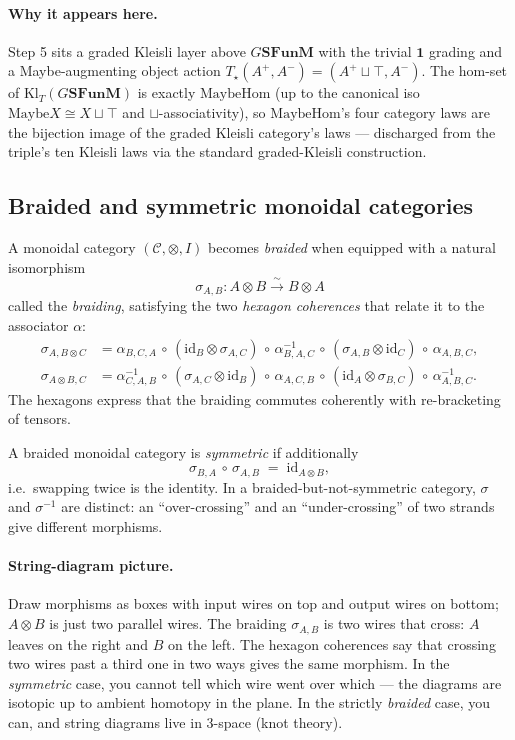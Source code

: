 \documentclass[11pt]{article}
\newcommand{\SFunM}{\mathbf{SFunM}}
\newcommand{\id}{\mathrm{id}}
\newcommand{\Maybe}{\mathrm{Maybe}}
\begin{document}
\paragraph{Why it appears here.}
Step 5 sits a graded Kleisli layer above $G\SFunM$ with the trivial
$\mathbf{1}$ grading and a Maybe-augmenting object action
$T_\star(A^+, A^-) = (A^+ \sqcup \top, A^-)$.  The hom-set of
$\mathrm{Kl}_T(G\SFunM)$ is exactly $\mathrm{MaybeHom}$ (up to the
canonical iso $\Maybe X \cong X \sqcup \top$ and $\sqcup$-associativity),
so $\mathrm{MaybeHom}$'s four category laws are the bijection image
of the graded Kleisli category's laws — discharged from the triple's
ten Kleisli laws via the standard graded-Kleisli construction.

\subsection{Braided and symmetric monoidal categories}
\label{sec:braided}

A monoidal category $(\mathcal{C}, \otimes, I)$ becomes
\emph{braided} when equipped with a natural isomorphism
\[
  \sigma_{A,B} : A \otimes B \xrightarrow{\sim} B \otimes A
\]
called the \emph{braiding}, satisfying the two \emph{hexagon
coherences} that relate it to the associator $\alpha$:
\begin{align*}
  \sigma_{A, B \otimes C}
    &= \alpha_{B,C,A} \,\circ\, (\id_B \otimes \sigma_{A,C}) \,\circ\,
       \alpha_{B,A,C}^{-1} \,\circ\, (\sigma_{A,B} \otimes \id_C) \,\circ\,
       \alpha_{A,B,C}, \\
  \sigma_{A \otimes B, C}
    &= \alpha_{C,A,B}^{-1} \,\circ\, (\sigma_{A,C} \otimes \id_B) \,\circ\,
       \alpha_{A,C,B} \,\circ\, (\id_A \otimes \sigma_{B,C}) \,\circ\,
       \alpha_{A,B,C}^{-1}.
\end{align*}
The hexagons express that the braiding commutes coherently with
re-bracketing of tensors.

A braided monoidal category is \emph{symmetric} if additionally
\[
  \sigma_{B, A} \,\circ\, \sigma_{A, B} \;=\; \id_{A \otimes B},
\]
i.e.\ swapping twice is the identity.  In a braided-but-not-symmetric
category, $\sigma$ and $\sigma^{-1}$ are distinct: an
``over-crossing'' and an ``under-crossing'' of two strands give
different morphisms.

\paragraph{String-diagram picture.}
Draw morphisms as boxes with input wires on top and output wires on
bottom; $A \otimes B$ is just two parallel wires.  The braiding
$\sigma_{A, B}$ is two wires that cross: $A$ leaves on the right and
$B$ on the left.  The hexagon coherences say that crossing two
wires past a third one in two ways gives the same morphism.  In the
\emph{symmetric} case, you cannot tell which wire went over which ---
the diagrams are isotopic up to ambient homotopy in the plane.  In
the strictly \emph{braided} case, you can, and string diagrams live
in 3-space (knot theory).
\end{document}
